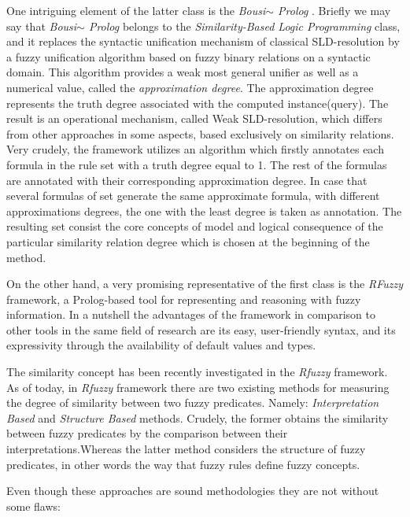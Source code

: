 \documentclass[egilmezThesis.tex]{subfiles}
\begin{document}
One intriguing element of the latter class is the \textsl{Bousi$\sim$ Prolog} \cite{JI11}. Briefly we may say that \textsl{Bousi$\sim$ Prolog} belongs to the \textsl{Similarity-Based Logic Programming} class, and it replaces the syntactic unification mechanism of classical SLD-resolution by a fuzzy unification algorithm based on fuzzy binary relations on a syntactic domain. 
This algorithm provides a weak most general unifier as well as a numerical value, called the \textsl{approximation degree}.
The approximation degree represents the truth degree associated with the computed instance(query). The result is an operational mechanism, called Weak SLD-resolution, which differs from other approaches in some aspects, based exclusively on similarity relations.
Very crudely, the framework utilizes an algorithm which firstly annotates each formula in the rule set with a truth degree equal to 1. The rest of the formulas are annotated with their corresponding approximation degree. In case that several formulas of set generate the same approximate formula, with different approximations degrees, the one with the least degree is taken as annotation. The resulting set consist the core concepts of model and logical consequence of the particular similarity relation degree which is chosen at the beginning of the method.

On the other hand, a very promising representative of the first class is the \textit{RFuzzy} framework, a Prolog-based tool for representing and reasoning with
fuzzy information. In a nutshell the advantages of the framework in comparison to other tools in the same field of research are its easy, user-friendly syntax, and its expressivity through the availability of default values and types. \cite{MPS10}


The similarity concept has been recently investigated in the \textsl{Rfuzzy} framework. As of today, in \textsl{Rfuzzy} framework there are two existing methods for measuring the degree of similarity between two fuzzy
predicates. Namely: \textit{Interpretation Based} and \textit{Structure Based} methods. Crudely, the former obtains the similarity between fuzzy predicates by the comparison between their interpretations.Whereas the latter method considers the structure of fuzzy
predicates, in other words the way that fuzzy rules define fuzzy concepts. \cite{Lu}

Even though these approaches are sound methodologies they are not without some flaws:
\end{document}
